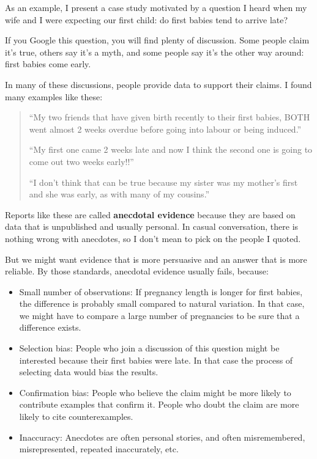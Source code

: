 \documentclass[12pt]{book}
\theoremstyle{exercise}
\begin{document}
As an example, I present a case study motivated by a question
I heard when my wife and I were expecting our first child: do first
babies tend to arrive late?%

If you Google this question, you will find plenty of discussion.  Some
people claim it's true, others say it's a myth, and some people say
it's the other way around: first babies come early.

In many of these discussions, people provide data to support their
claims.  I found many examples like these:

\begin{quote}

``My two friends that have given birth recently to their first babies,
BOTH went almost 2 weeks overdue before going into labour or being
induced.''

``My first one came 2 weeks late and now I think the second one is
going to come out two weeks early!!''

``I don't think that can be true because my sister was my mother's
first and she was early, as with many of my cousins.''

\end{quote}

Reports like these are called {\bf anecdotal evidence} because they
are based on data that is unpublished and usually personal.  In casual
conversation, there is nothing wrong with anecdotes, so I don't mean
to pick on the people I quoted.%

But we might want evidence that is more persuasive and
an answer that is more reliable.  By those standards, anecdotal
evidence usually fails, because:

\begin{itemize}

\item Small number of observations: If pregnancy length is longer
  for first babies, the difference is probably small compared to
  natural variation.  In that case, we might have to compare a large
  number of pregnancies to be sure that a difference exists.%

\item Selection bias: People who join a discussion of this question
  might be interested because their first babies were late.  In that
  case the process of selecting data would bias the results.%
%

\item Confirmation bias:  People who believe the claim might be more
  likely to contribute examples that confirm it.  People who doubt the
  claim are more likely to cite counterexamples.%
%

\item Inaccuracy: Anecdotes are often personal stories, and often
  misremembered, misrepresented, repeated
  inaccurately, etc.

\end{itemize}
\end{document}
